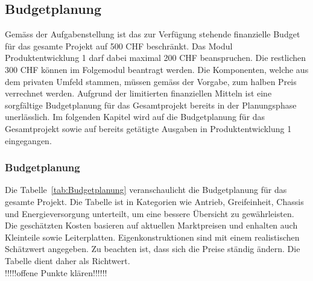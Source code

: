 \documentclass[main.tex]{subfiles} %
\begin{document}

\subsection{Budgetplanung}

Gemäss der Aufgabenstellung ist das zur Verfügung stehende finanzielle Budget 
für das gesamte Projekt
auf 500 CHF beschränkt. Das Modul Produktentwicklung 1 darf dabei maximal 200 CHF
beanspruchen. Die restlichen 300 CHF können im Folgemodul beantragt werden. 
Die Komponenten, welche aus dem privaten Umfeld stammen, 
müssen gemäss der Vorgabe, zum halben Preis verrechnet werden. Aufgrund der limitierten 
finanziellen Mitteln ist eine sorgfältige Budgetplanung für das Gesamtprojekt bereits in
der Planungsphase unerlässlich. Im folgenden Kapitel 
wird auf die Budgetplanung für das Gesamtprojekt sowie auf bereits getätigte Ausgaben in
Produktentwicklung 1 eingegangen.

\subsubsection*{Budgetplanung}
Die Tabelle~\ref{tab:Budgetplanung} veranschaulicht die Budgetplanung für das 
gesamte Projekt. Die Tabelle ist in Kategorien wie Antrieb, Greifeinheit, 
Chassis und Energieversorgung unterteilt, um eine bessere Übersicht zu gewährleisten. 
Die geschätzten Kosten basieren auf aktuellen Marktpreisen und enhalten auch 
Kleinteile sowie Leiterplatten. Eigenkonstruktionen sind mit einem realistischen 
Schätzwert angegeben. Zu beachten ist, dass sich die Preise ständig ändern. Die 
Tabelle dient daher als Richtwert.\\

!!!!!offene Punkte klären!!!!!!

\newpage
\end{document}
